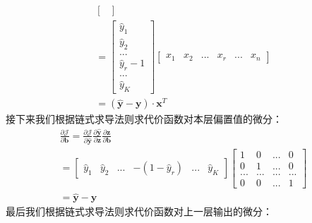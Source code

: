 \documentclass[UTF8]{article}
\begin{document}
\begin{equation}
\begin{aligned}
\begin{bmatrix}
\end{bmatrix} \\
=\begin{bmatrix}
\hat{y}_{1} \\
\hat{y}_{2} \\
... \\
\hat{y}_{r} - 1 \\
... \\
\hat{y}_{K}
\end{bmatrix} \begin{bmatrix}
x_{1} & x_{2} & ... & x_{r} & ... & x_{n}
 \end{bmatrix} \\
=(\hat{\boldsymbol{y}}-\boldsymbol{y}) \cdot \boldsymbol{x}^{T}
\end{aligned}
\label{mlp-pj-pW-def}
\end{equation}
接下来我们根据链式求导法则求代价函数对本层偏置值的微分：
\begin{equation}
\begin{aligned}
\frac{\partial{\mathcal{J}}}{\partial{\boldsymbol{b}}}=\frac{\partial{\mathcal{J}}}{\partial{\hat{\boldsymbol{y}}}} \frac{\partial{\hat{\boldsymbol{y}}}}{\partial{\boldsymbol{z}}} \frac{\partial{\boldsymbol{z}}}{\partial{\boldsymbol{b}}} \\
=\begin{bmatrix}
\hat{y}_{1} & \hat{y}_{2} & ... & -(1-\hat{y}_{r}) & ... & \hat{y}_{K}
\end{bmatrix} \begin{bmatrix}
1 & 0 & ... & 0 \\
0 & 1 & ... & 0 \\
... & ... & ... & ... \\
0 & 0 & ... & 1
\end{bmatrix} \\
=\hat{\boldsymbol{y}}-\boldsymbol{y}
\end{aligned}
\label{mlp-pj-pb-def}
\end{equation}
最后我们根据链式求导法则求代价函数对上一层输出的微分：
\end{document}
